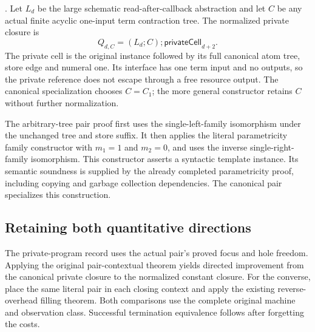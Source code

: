 .
Let $L_d$ be the large schematic read-after-callback abstraction and let
$C$ be any actual finite acyclic one-input term contraction tree. The
normalized private closure is
\[
 Q_{d,C}=(L_d;C);\mathsf{privateCell}_{d+2}.
\]
The private cell is the original instance followed by its full canonical
atom tree, store edge and numeral one. Its interface has one term input and
no outputs, so the private reference does not escape through a free
resource output. The canonical specialization chooses $C=C_1$; the more
general constructor retains $C$ without further normalization.

The arbitrary-tree pair proof first uses the single-left-family isomorphism
under the unchanged tree and store suffix. It then applies the literal
parametricity family constructor with $m_1=1$ and $m_2=0$, and uses the
inverse single-right-family isomorphism. This constructor asserts a
syntactic template instance. Its semantic soundness is supplied by the
already completed parametricity proof, including copying and garbage
collection dependencies. The canonical pair specializes this construction.

\subsection{Retaining both quantitative directions}
The private-program record uses the actual pair's proved focus and hole
freedom. Applying the original pair-contextual theorem yields directed
improvement from the canonical private closure to the normalized constant
closure. For the converse, place the same literal pair in each closing
context and apply the existing reverse-overhead filling theorem. Both
comparisons use the complete original machine and observation class.
Successful termination equivalence follows after forgetting the costs.

